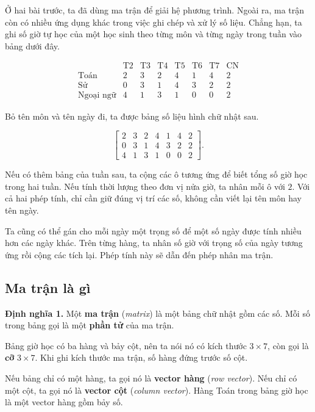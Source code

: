 \documentclass[12pt,a4paper]{article}
\begin{document}
Ở hai bài trước, ta đã dùng ma trận để giải hệ phương trình. Ngoài ra, ma trận còn có nhiều ứng dụng khác trong việc ghi chép và xử lý số liệu. 
Chẳng hạn, ta ghi số giờ tự học của một học sinh theo từng môn và từng ngày trong tuần vào bảng dưới đây.

$$
\begin{array}{c|ccccccc} & \text{T2} & \text{T3} & \text{T4} & \text{T5} & \text{T6} & \text{T7} & \text{CN}\\ \hline
\text{Toán} & 2 & 3 & 2 & 4 & 1 & 4 & 2\\
\text{Sử} & 0 & 3 & 1 & 4 & 3 & 2 & 2\\
\text{Ngoại ngữ} & 4 & 1 & 3 & 1 & 0 & 0 & 2
\end{array}
$$

Bỏ tên môn và tên ngày đi, ta được bảng số liệu hình chữ nhật sau.

$$
\left[ \begin{array}{ccccccc}
2 & 3 & 2 & 4 & 1 & 4 & 2\\
0 & 3 & 1 & 4 & 3 & 2 & 2\\
4 & 1 & 3 & 1 & 0 & 0 & 2
\end{array} \right].
$$

Nếu có thêm bảng của tuần sau, ta cộng các ô tương ứng để biết tổng số giờ học trong hai tuần. Nếu tính thời lượng theo đơn vị nửa giờ, ta nhân mỗi ô với \(2\). Với cả hai phép tính, chỉ cần giữ đúng vị trí các số, không cần viết lại tên môn hay tên ngày.

Ta cũng có thể gán cho mỗi ngày một trọng số để một số ngày được tính nhiều hơn các ngày khác. Trên từng hàng, ta nhân số giờ với trọng số của ngày tương ứng rồi cộng các tích lại. Phép tính này sẽ dẫn đến phép nhân ma trận.

\subsection{Ma trận là gì}

\textbf{Định nghĩa 1.} Một \textbf{ma trận} (\emph{matrix}) là một bảng chữ nhật gồm các số. Mỗi số trong bảng gọi là một \textbf{phần tử} của ma trận.

Bảng giờ học có ba hàng và bảy cột, nên ta nói nó có kích thước \(3\times7\), còn gọi là \textbf{cỡ} \(3\times7\). Khi ghi kích thước ma trận, số hàng đứng trước số cột.

Nếu bảng chỉ có một hàng, ta gọi nó là \textbf{vector hàng} (\emph{row vector}). Nếu chỉ có một cột, ta gọi nó là \textbf{vector cột} (\emph{column vector}). Hàng Toán trong bảng giờ học là một vector hàng gồm bảy số.
\end{document}
